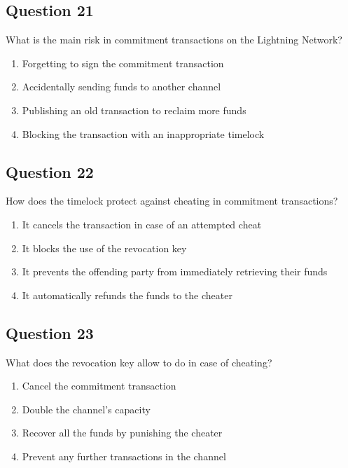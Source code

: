 \documentclass[12pt,a4paper]{article}
\begin{document}
\subsection*{Question 21}
What is the main risk in commitment transactions on the Lightning Network?

\begin{enumerate}[label=\Alph*., leftmargin=*]
\item Forgetting to sign the commitment transaction
\item Accidentally sending funds to another channel
\item Publishing an old transaction to reclaim more funds
\item Blocking the transaction with an inappropriate timelock
\end{enumerate}

\bigskip


\subsection*{Question 22}
How does the timelock protect against cheating in commitment transactions?

\begin{enumerate}[label=\Alph*., leftmargin=*]
\item It cancels the transaction in case of an attempted cheat
\item It blocks the use of the revocation key
\item It prevents the offending party from immediately retrieving their funds
\item It automatically refunds the funds to the cheater
\end{enumerate}

\bigskip


\subsection*{Question 23}
What does the revocation key allow to do in case of cheating?

\begin{enumerate}[label=\Alph*., leftmargin=*]
\item Cancel the commitment transaction
\item Double the channel's capacity
\item Recover all the funds by punishing the cheater
\item Prevent any further transactions in the channel
\end{enumerate}
\end{document}
